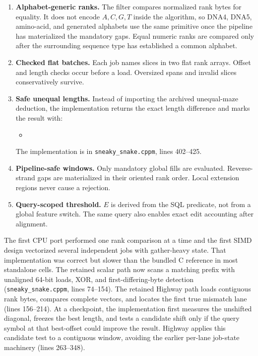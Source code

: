 \begin{enumerate}
    \item \textbf{Alphabet-generic ranks.}  The filter compares normalized
    rank bytes for equality.  It does not encode \(A,C,G,T\) inside the
    algorithm, so DNA4, DNA5, amino-acid, and generated alphabets use the same
    primitive once the pipeline has materialized the mandatory gaps.  Equal
    numeric ranks are compared only after the surrounding sequence type has
    established a common alphabet.
    \item \textbf{Checked flat batches.}  Each job names slices in two flat
    rank arrays.  Offset and length checks occur before a load.  Oversized
    spans and invalid slices conservatively survive.
    \item \textbf{Safe unequal lengths.}  Instead of importing the archived
    unequal-maze deduction, the implementation returns the exact length
    difference and marks the result with:
    \begin{itemize}
        \item {}
    \end{itemize}
    The implementation is in \texttt{sneaky\_snake.cppm}, lines 402--425.
    \item \textbf{Pipeline-safe windows.}  Only mandatory global fills are
    evaluated.  Reverse-strand gaps are materialized in their oriented rank
    order.  Local extension regions never cause a rejection.
    \item \textbf{Query-scoped threshold.}  \(E\) is derived from the SQL
    predicate, not from a global feature switch.  The same query also enables
    exact edit accounting after alignment.
\end{enumerate}

The first CPU port performed one rank comparison at a time and the first SIMD
design vectorized several independent jobs with gather-heavy state.  That
implementation was correct but slower than the bundled C reference in most
standalone cells.  The retained scalar path now scans a matching prefix with
unaligned 64-bit loads, XOR, and first-differing-byte detection
(\texttt{sneaky\_snake.cppm}, lines 74--154).  The retained Highway path loads
contiguous rank bytes, compares complete vectors, and locates the first true
mismatch lane (lines 156--214).  At a checkpoint, the implementation first
measures the unshifted diagonal, freezes the best length, and tests a candidate
shift only if the query symbol at that best-offset could improve the result.
Highway applies this candidate test to a contiguous window, avoiding the
earlier per-lane job-state machinery (lines 263--348).


